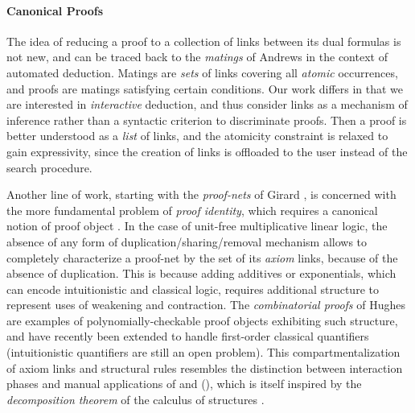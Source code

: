 \paragraph{Canonical Proofs}

The idea of reducing a proof to a collection of links between its dual formulas
is not new, and can be traced back to the \emph{matings} of Andrews
 in the context of automated deduction. Matings are
\emph{sets} of links covering all \emph{atomic} occurrences, and proofs are
matings satisfying certain conditions. Our work differs in that we are
interested in \emph{interactive} deduction, and thus consider links as a
mechanism of inference rather than a syntactic criterion to discriminate proofs.
Then a proof is better understood as a \emph{list} of links, and the atomicity
constraint is relaxed to gain expressivity, since the creation of links is
offloaded to the user instead of the search procedure.

Another line of work, starting with the \emph{proof-nets} of Girard
, is concerned with the more fundamental problem of
\emph{proof identity}, which requires a canonical notion of proof object
. In the case of unit-free multiplicative
linear logic, the absence of any form of duplication/sharing/removal mechanism
allows to completely characterize a proof-net by the set of its \emph{axiom}
links,
because of the absence of duplication. This is because adding additives or
exponentials, which can encode intuitionistic and classical logic, requires
additional structure to represent uses of weakening and contraction. The
\emph{combinatorial proofs} of Hughes
 are examples of
polynomially-checkable proof objects exhibiting such structure, and have
recently been extended to handle first-order classical quantifiers
 (intuitionistic quantifiers are still an open
problem). This compartmentalization of axiom links and structural rules
resembles the distinction between interaction phases and manual applications of
{} and {} (), which is itself inspired
by the \emph{decomposition theorem} of the calculus of structures
.


